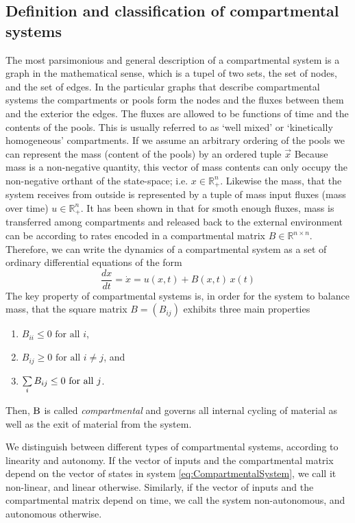 \subsection{Definition and classification of compartmental systems} The most
parsimonious and general description of a compartmental system is a graph in
the mathematical sense, which is a tupel of two sets, the set of nodes, and the
set of edges.  In the particular graphs that describe compartmental systems the
compartments or pools form the nodes and the fluxes between them and the
exterior the edges.  The fluxes are allowed to be functions of time and the
contents of the pools. This is usually referred to as `well mixed' or
`kinetically homogeneous' compartments.  
If we assume an arbitrary ordering of the pools we can represent the mass (content of the pools)
by an ordered tuple $\vec{x}$ 
Because mass is a non-negative quantity, this vector of mass contents can
only occupy the non-negative orthant of the state-space; i.e. $x \in
\mathbb{R}^n_+$. 
Likewise the mass, that the system receives from outside is represented
by a tuple of mass input fluxes (mass over time) $u \in \mathbb{R}^n_+$.
It has been shown in \citep{Jacquez1993SIAM}
that for smoth enough fluxes, mass is transferred among compartments and released back to the external
environment can be according to rates encoded in a compartmental matrix $B \in
\mathbb{R}^{n \times n}$. 
Therefore, we can write the dynamics of a
compartmental system as a set of ordinary differential equations of the form
\begin{equation} \label{eq:CompartmentalSystem}
\frac{dx}{dt} = \dot{x} = u(x, t) + B(x, t) \, x(t)
\end{equation}
The key property of compartmental systems is, in order for the system to balance mass, that the square matrix $B=(B_{ij})$ exhibits three main properties
\begin{enumerate}
  \item $B_{ii}\leq0\text{ for all }i$,
  \item $B_{ij}\geq0\text{ for all }i\neq j$, and
  \item $\sum\limits_i B_{ij}\leq 0\text{ for all }j$.
\end{enumerate}
Then, $\mathrm{B}$ is called \emph{compartmental} and governs all internal cycling of material as well as the exit of material from the system.

We distinguish between different types of compartmental systems, according to linearity and autonomy. If the vector of inputs and the compartmental matrix depend on the vector of states in system \eqref{eq:CompartmentalSystem}, we call it non-linear, and linear otherwise. Similarly, if the vector of inputs and the compartmental matrix depend on time, we call the system non-autonomous, and autonomous otherwise. 

